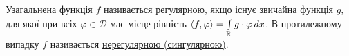 \begin{theory}
    Узагальнена функція $f$ називається \ul{регулярною}, якщо існує звичайна
    функція $g$, для якої при всіх $\varphi \in \mathcal{D}$ має місце
    рівність $\left\langle f, \varphi\right\rangle = \int\limits_{\mathbb{R}}^{} g\cdot \varphi \,dx$.
    В протилежному випадку $f$ називається \ul{нерегулярною (сингулярною)}.
\end{theory}